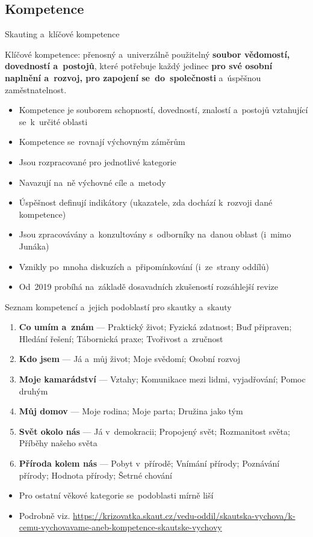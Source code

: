 \documentclass[compress, xelatex, 11pt, xcolor=dvipsnames, print, aspectratio=169,
	hyperref={
		bookmarks=true,
		unicode=true,
		colorlinks=true,
		pdftitle={Skautska vychovna metoda},
		plainpages=false,
		pdfauthor={Vojtech Zeisek},
		pdfsubject={Skautska vychovna metoda a jeji vyvoj za posledni stoleti a desetileti},
		pdfcreator={XeLaTeX},
		pdfkeywords={Junak, Pedagogika, Skaut, Skauting, Vychovna metoda},
		linkcolor=Red, %
		anchorcolor=ForestGreen, %
		citecolor=ForestGreen, %
		filecolor=ForestGreen, %
		menucolor=ForestGreen, %
		urlcolor=Sepia, %
		pdftex},
	url={hyphens, lowtilde} %
	]{beamer}
\begin{document}
\subsection{Kompetence}

\begin{frame}{Skauting a~klíčové kompetence}
	\begin{center}
		Klíčové kompetence: přenosný a~univerzálně použitelný \textbf{soubor vědomostí, dovedností a~postojů}, které potřebuje každý jedinec \textbf{pro své osobní naplnění a~rozvoj, pro zapojení se~do~společnosti} a~úspěšnou zaměstnatelnost.
	\end{center}
	\begin{itemize}
		\item Kompetence je souborem schopností, dovedností, znalostí a~postojů vztahující se~k~určité oblasti
		\item Kompetence se~rovnají výchovným záměrům
		\item Jsou rozpracované pro jednotlivé kategorie
		\item Navazují na~ně výchovné cíle a~metody
		\item Úspěšnost definují indikátory (ukazatele, zda dochází k~rozvoji dané kompetence)
		\item Jsou zpracovávány a~konzultovány s~odborníky na~danou oblast (i~mimo Junáka)
		\item Vznikly po~mnoha diskuzích a~připomínkování (i~ze~strany oddílů)
		\item Od~2019 probíhá na~základě dosavadních zkušeností rozsáhlejší revize
	\end{itemize}
\end{frame}

\begin{frame}{Seznam kompetencí a~jejich podoblastí pro skautky a~skauty}
	\begin{enumerate}
		\item \textbf{Co umím a~znám} --- Praktický život; Fyzická zdatnost; Buď připraven; Hledání řešení; Tábornická praxe; Tvořivost a~zručnost
		\item \textbf{Kdo jsem} --- Já a~můj život; Moje svědomí; Osobní rozvoj
		\item \textbf{Moje kamarádství} --- Vztahy; Komunikace mezi lidmi, vyjadřování; Pomoc druhým
		\item \textbf{Můj domov} --- Moje rodina; Moje parta; Družina jako tým
		\item \textbf{Svět okolo nás} --- Já v~demokracii; Propojený svět; Rozmanitost světa; Příběhy našeho světa
		\item \textbf{Příroda kolem nás} --- Pobyt v~přírodě; Vnímání přírody; Poznávání přírody; Hodnota přírody; Šetrné chování
	\end{enumerate}
	\begin{itemize}
		\item Pro ostatní věkové kategorie se~podoblasti mírně liší
		\item Podrobně viz. \url{https://krizovatka.skaut.cz/vedu-oddil/skautska-vychova/k-cemu-vychovavame-aneb-kompetence-skautske-vychovy}
	\end{itemize}
\end{frame}
\end{document}
